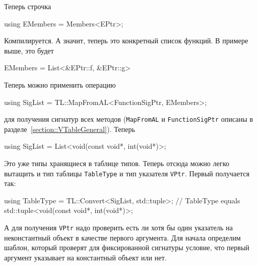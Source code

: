 Теперь строчка
\begin{cppcode}
using EMembers = Members<EPtr>;
\end{cppcode}
Компилируется.
А значит, теперь это конкретный список функций.
В примере выше, это будет
\begin{cppcode}[numbers = none]
EMembers = List<&EPtr::f, &EPtr::g>
\end{cppcode}
Теперь можно применить операцию
\begin{cppcode}[numbers = none]
using SigList = TL::MapFromAL<FunctionSigPtr, EMembers>;
\end{cppcode}
для получения сигнатур всех методов (\verb"MapFromAL" и \verb"FunctionSigPtr" описаны в разделе~\ref{section::VTableGeneral}).
Теперь
\begin{cppcode}[numbers = none]
using SigList = List<void(const void*, int(void*)>;
\end{cppcode}
Это уже типы хранящиеся в таблице типов.
Теперь отсюда можно легко вытащить и тип таблицы \verb"TableType" и тип указателя \verb"VPtr".
Первый получается так:
\begin{cppcode}[numbers = none]
using TableType = TL::Convert<SigList, std::tuple>;
// TableType equals std::tuple<void(const void*, int(void*)>;
\end{cppcode}
А для получения \verb"VPtr" надо проверить есть ли хотя бы один указатель на неконстантный объект в качестве первого аргумента.
Для начала определим шаблон, который проверят для фиксированной сигнатуры условие, что первый аргумент указывает на константный объект или нет.
